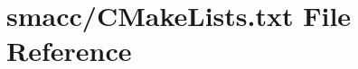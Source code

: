 \hypertarget{CMakeLists_8txt}{}\section{smacc/\+C\+Make\+Lists.txt File Reference}
\label{CMakeLists_8txt}

